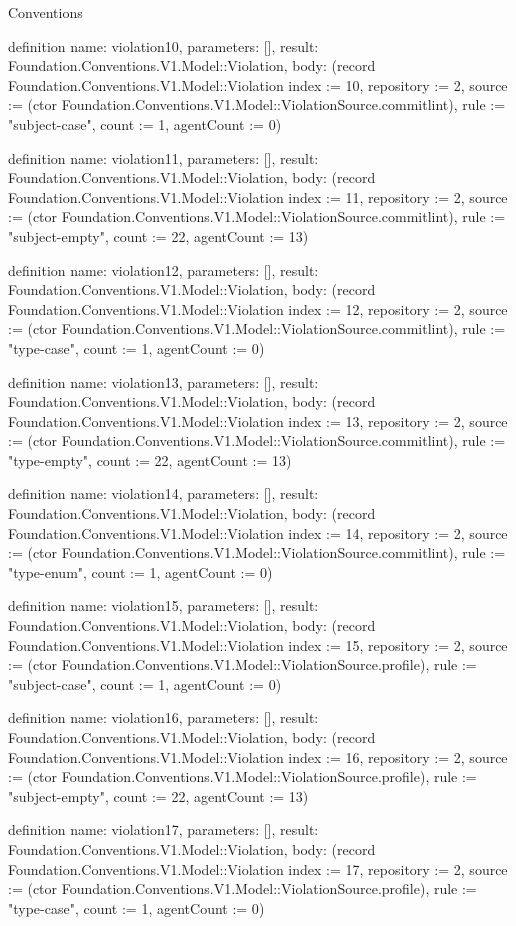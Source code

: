 \begin{lexlean}{Conventions}
\begin{semanticmodule}
definition{
  name: violation10,
  parameters: [],
  result: Foundation.Conventions.V1.Model::Violation,
  body: (record Foundation.Conventions.V1.Model::Violation {index := 10, repository := 2, source := (ctor Foundation.Conventions.V1.Model::ViolationSource.commitlint), rule := "subject-case", count := 1, agentCount := 0})
}

definition{
  name: violation11,
  parameters: [],
  result: Foundation.Conventions.V1.Model::Violation,
  body: (record Foundation.Conventions.V1.Model::Violation {index := 11, repository := 2, source := (ctor Foundation.Conventions.V1.Model::ViolationSource.commitlint), rule := "subject-empty", count := 22, agentCount := 13})
}

definition{
  name: violation12,
  parameters: [],
  result: Foundation.Conventions.V1.Model::Violation,
  body: (record Foundation.Conventions.V1.Model::Violation {index := 12, repository := 2, source := (ctor Foundation.Conventions.V1.Model::ViolationSource.commitlint), rule := "type-case", count := 1, agentCount := 0})
}

definition{
  name: violation13,
  parameters: [],
  result: Foundation.Conventions.V1.Model::Violation,
  body: (record Foundation.Conventions.V1.Model::Violation {index := 13, repository := 2, source := (ctor Foundation.Conventions.V1.Model::ViolationSource.commitlint), rule := "type-empty", count := 22, agentCount := 13})
}

definition{
  name: violation14,
  parameters: [],
  result: Foundation.Conventions.V1.Model::Violation,
  body: (record Foundation.Conventions.V1.Model::Violation {index := 14, repository := 2, source := (ctor Foundation.Conventions.V1.Model::ViolationSource.commitlint), rule := "type-enum", count := 1, agentCount := 0})
}

definition{
  name: violation15,
  parameters: [],
  result: Foundation.Conventions.V1.Model::Violation,
  body: (record Foundation.Conventions.V1.Model::Violation {index := 15, repository := 2, source := (ctor Foundation.Conventions.V1.Model::ViolationSource.profile), rule := "subject-case", count := 1, agentCount := 0})
}

definition{
  name: violation16,
  parameters: [],
  result: Foundation.Conventions.V1.Model::Violation,
  body: (record Foundation.Conventions.V1.Model::Violation {index := 16, repository := 2, source := (ctor Foundation.Conventions.V1.Model::ViolationSource.profile), rule := "subject-empty", count := 22, agentCount := 13})
}

definition{
  name: violation17,
  parameters: [],
  result: Foundation.Conventions.V1.Model::Violation,
  body: (record Foundation.Conventions.V1.Model::Violation {index := 17, repository := 2, source := (ctor Foundation.Conventions.V1.Model::ViolationSource.profile), rule := "type-case", count := 1, agentCount := 0})
}


\end{semanticmodule}
\end{lexlean}
